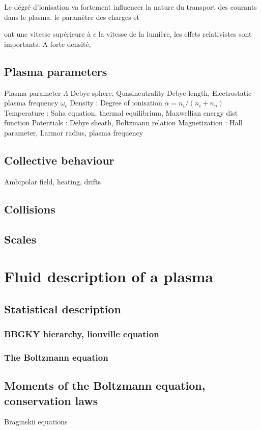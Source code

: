 			Le dégré d'ionisation va fortement influencer la nature du transport des courants dans le plasma.
			le paramètre des charges et 
			  
			ont une vitesse supérieure à $c$ la vitesse de la lumière, les effets
			relativistes sont importants. A forte densité, 
			
		\subsection{Plasma parameters}
		 Plasma parameter $\Lambda$ Debye sphere, Quasineutrality Debye length,
		Electrostatic plasma frequency $\omega_c$
		 Density : Degree of ionisation $\alpha=n_i/(n_i+n_n)$
			Temperature : Saha equation, thermal equilibrium, Maxwellian energy dist function
			Potentials : Debye sheath, Boltzmann relation
			Magnetization : Hall parameter, Larmor radius, plasma frequency
		\subsection{Collective behaviour}
			Ambipolar field, heating, drifts
		\subsection{Collisions}
		\subsection{Scales}
		
	\section{Fluid description of a plasma}
		\subsection{Statistical description}
			\subsubsection{BBGKY hierarchy, liouville equation}
			\subsubsection{The Boltzmann equation}
		\subsection{Moments of the Boltzmann equation, conservation laws}
			Braginskii equations

